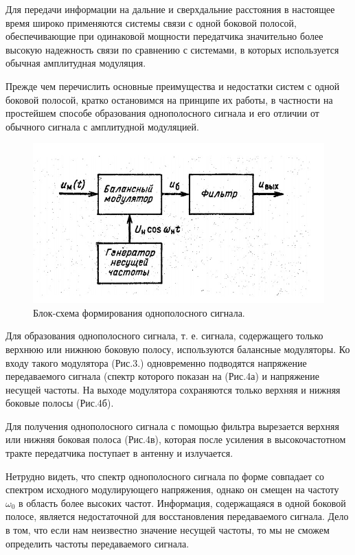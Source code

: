 Для передачи информации на дальние и сверхдальние расстояния в настоящее время широко применяются системы связи с одной боковой полосой, обеспечивающие при одинаковой мощности передатчика значительно более высокую надежность связи по сравнению с системами, в которых используется обычная амплитудная модуляция.

Прежде чем перечислить основные преимущества и недостатки систем с одной боковой полосой, кратко остановимся на принципе их работы, в частности на простейшем способе образования однополосного сигнала и его отличии от обычного сигнала с амплитудной модуляцией.

\begin{figure}[H]
	\centering
	\includegraphics[width=0.5\linewidth]{fig/fig3}
	\caption{ Блок-схема формирования однополосного сигнала.}
	\label{fig:fig3}
\end{figure}

Для образования однополосного сигнала, т. е. сигнала, содержащего только верхнюю или нижнюю боковую полосу, используются балансные модуляторы. Ко входу такого модулятора (Рис.3.) одновременно подводятся напряжение передаваемого сигнала (спектр которого показан на (Рис.4а) и напряжение несущей частоты. На выходе модулятора сохраняются только
верхняя и нижняя боковые полосы (Рис.4б). 

Для получения однополосного сигнала с помощью фильтра вырезается верхняя или нижняя боковая полоса (Рис.4в), которая после усиления в высокочастотном тракте передатчика поступает в антенну и излучается.

Нетрудно видеть, что спектр однополосного сигнала по форме совпадает со спектром исходного модулирующего напряжения, однако он смещен на частоту $\omega_0$ в область более высоких частот. Информация, содержащаяся в одной боковой полосе, является недостаточной для восстановления передаваемого сигнала. Дело в том, что если нам неизвестно значение несущей частоты, то мы не сможем определить частоты передаваемого сигнала.

